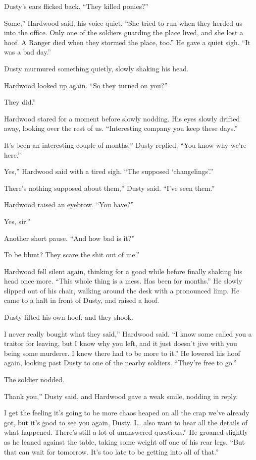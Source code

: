 Dusty’s ears flicked back. “They killed ponies?”

\leavevmode{}Some,” Hardwood said, his voice quiet. “She tried to run when they herded us into the office. Only one of the soldiers guarding the place lived, and she lost a hoof. A Ranger died when they stormed the place, too.” He gave a quiet sigh. “It was a bad day.”

Dusty murmured something quietly, slowly shaking his head.

Hardwood looked up again. “So they turned on you?”

\leavevmode{}They did.”

Hardwood stared for a moment before slowly nodding. His eyes slowly drifted away, looking over the rest of us. “Interesting company you keep these days.”

\leavevmode{}It’s been an interesting couple of months,” Dusty replied. “You know why we’re here.”

\leavevmode{}Yes,” Hardwood said with a tired sigh. “The supposed ‘changelings’.”

\leavevmode{}There’s nothing supposed about them,” Dusty said. “I’ve seen them.”

Hardwood raised an eyebrow. “You have?”

\leavevmode{}Yes, sir.”

Another short pause. “And how bad is it?”

\leavevmode{}To be blunt? They scare the shit out of me.”

Hardwood fell silent again, thinking for a good while before finally shaking his head once more. “This whole thing is a mess. Has been for months.” He slowly slipped out of his chair, walking around the desk with a pronounced limp. He came to a halt in front of Dusty, and raised a hoof.

Dusty lifted his own hoof, and they shook.

\leavevmode{}I never really bought what they said,” Hardwood said. “I know some called you a traitor for leaving, but I know why you left, and it just doesn’t jive with you being some murderer. I knew there had to be more to it.” He lowered his hoof again, looking past Dusty to one of the nearby soldiers. “They’re free to go.”

The soldier nodded.

\leavevmode{}Thank you,” Dusty said, and Hardwood gave a weak smile, nodding in reply.

\leavevmode{}I get the feeling it’s going to be more chaos heaped on all the crap we’ve already got, but it’s good to see you again, Dusty. I… also want to hear all the details of what happened. There’s still a lot of unanswered questions.” He groaned slightly as he leaned against the table, taking some weight off one of his rear legs. “But that can wait for tomorrow. It’s too late to be getting into all of that.”

